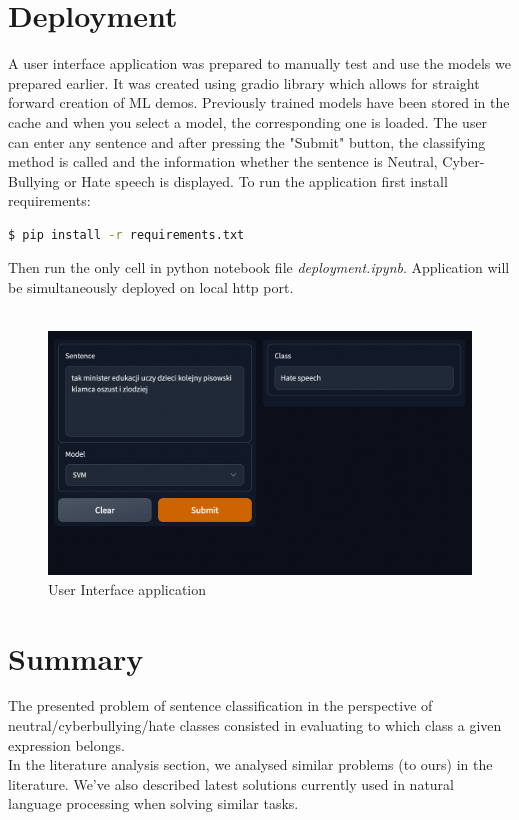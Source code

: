 \documentclass[a4paper]{article}
\begin{document}
\section{Deployment}
\hspace{0.8cm}
A user interface application was prepared to manually test and use the models we prepared earlier. It was created using gradio library which allows for straight forward creation of ML demos. Previously trained models have been stored in the cache and when you select a model, the corresponding one is loaded. The user can enter any sentence and after pressing the "Submit" button, the classifying method is called and the information whether the sentence is Neutral, Cyber-Bullying or Hate speech is displayed. To run the application first install requirements:
\begin{lstlisting}[language=bash]
  $ pip install -r requirements.txt
\end{lstlisting}
Then run the only cell in python notebook file \emph{deployment.ipynb}. Application will be simultaneously deployed on local http port.
\\
\\
\begin{figure}[h]
\centering
\includegraphics[width=\textwidth]{plots/deployment.png}
\caption{User Interface application}
\label{fig:ui_application}
\end{figure}

\newpage
\section{Summary}

The presented problem of sentence classification in the perspective of neutral/cyberbullying/hate classes consisted in evaluating to which class a given expression belongs. \\
In the literature analysis section, we analysed similar problems (to ours) in the literature. We've also described latest solutions currently used in natural language processing when solving similar tasks. \\
\end{document}
